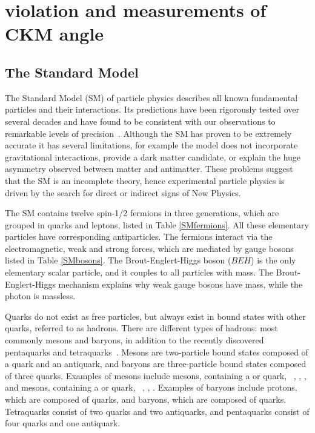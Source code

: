 %

\chapter{\label{ch:2-background}\CP violation and measurements of CKM angle \Pgamma} 


\section{The Standard Model}

The Standard Model (SM) of particle physics describes all known fundamental particles and their interactions. Its predictions have been rigorously tested over several decades and have found to be consistent with our observations to remarkable levels of precision~\cite{SMprecision}. Although the SM has proven to be extremely accurate it has several limitations, for example the model does not incorporate gravitational interactions, provide a dark matter candidate, or explain the huge asymmetry observed between matter and antimatter. These problems suggest that the SM is an incomplete theory, hence experimental particle physics is driven by the search for direct or indirect signs of New Physics.

The SM contains twelve spin-1/2 fermions in three generations, which are grouped in quarks and leptons, listed in Table \ref{SMfermions}. All these elementary particles have corresponding antiparticles. The fermions interact via the electromagnetic, weak and strong forces, which are mediated by gauge bosons listed in Table \ref{SMbosons}. The Brout-Englert-Higgs boson ($BEH$) is the only elementary scalar particle, and it couples to all particles with mass. The Brout-Englert-Higgs mechanism explains why weak gauge bosons have mass, while the photon is massless. 

Quarks do not exist as free particles, but always exist in bound states with other quarks, referred to as hadrons. There are different types of hadrons: most commonly mesons and baryons, in addition to the recently discovered pentaquarks and tetraquarks~\cite{pentaquark,tetraquark_BESIII,tetraquark_lhcb}. Mesons are two-particle bound states composed of a quark and an antiquark, and baryons are three-particle bound states composed of three quarks. Examples of mesons include \B mesons, containing a \bquark or \bquarkbar quark, \eg~\Bm, \Bp, \Bz, and \D mesons, containing a \cquark or \cquarkbar quark, \eg~\Dm, \Dp, \Dz. Examples of baryons include protons, which are composed of \uquark\uquark\dquark quarks, and \Lz baryons, which are composed of \uquark\dquark\squark quarks. Tetraquarks consist of two quarks and two antiquarks, and pentaquarks consist of four quarks and one antiquark.

